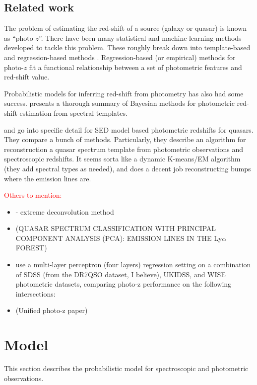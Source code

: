 \documentclass{article}
\newcommand{\red}[1]{\textcolor{red}{#1}}
\begin{document}
\subsection{Related work}
The problem of estimating the red-shift of a source (galaxy or quasar) is known as ``photo-$z$''.  There have been many statistical and machine learning methods developed to tackle this problem. These roughly break down into template-based and regression-based methods \cite{walcher2011fitting}.  Regression-based (or empirical) methods for photo-$z$ fit a functional relationship between a set of photometric features and red-shift value.  

Probabilistic models for inferring red-shift from photometry has also had some success.  \cite{benitez2000bayesian} presents a thorough summary of Bayesian methods for photometric red-shift estimation from spectral templates.  

\cite{budavari2001photometric} and \cite{richards2001photometric} go into specific detail for SED model based photometric redshifts for quasars.  They compare a bunch of methods. Particularly, they describe an algorithm for reconstruction a quasar spectrum template from photometric observations and spectroscopic redshifts.  It seems sorta like a dynamic K-means/EM algorithm (they add spectral types as needed), and does a decent job reconstructing bumps where the emission lines are.  

\red{Others to mention: }
\begin{itemize}
\item \cite{bovy2012photometric} - extreme deconvolution method

\item \cite{suzuki2006quasar} (QUASAR SPECTRUM CLASSIFICATION WITH PRINCIPAL COMPONENT ANALYSIS (PCA): EMISSION LINES IN THE Ly$\alpha$ FOREST)

\item \cite{brescia2013photometric} use a multi-layer perceptron (four layers) regression setting on a combination of SDSS (from the DR7QSO dataset, I believe), UKIDSS, and WISE photometric datasets, comparing photo-z performance on the following intersections:   
 
\item \cite{budavari2009unified} (Unified photo-z paper)
\end{itemize}


\section{Model}
This section describes the probabilistic model for spectroscopic and photometric observations.  
\end{document}
